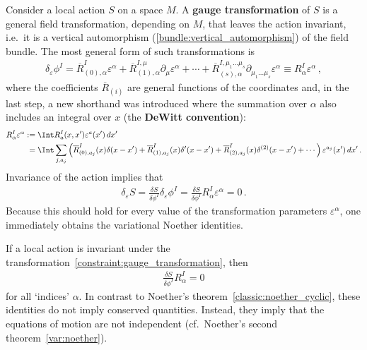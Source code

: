     Consider a local action $S$ on a space $M$. A \textbf{gauge transformation} of $S$ is a general field transformation, depending on $M$, that leaves the action invariant, i.e.~it is a vertical automorphism (\cref{bundle:vertical_automorphism}) of the field bundle. The most general form of such transformations is
    \begin{gather}
        \label{constraint:gauge_transformation}
        \delta_\varepsilon\phi^I = \overline{R}^I_{(0),\alpha}\varepsilon^\alpha + \overline{R}^{I,\mu}_{(1),\alpha}\partial_\mu\varepsilon^\alpha + \cdots + \overline{R}^{I,\mu_1\ldots\mu_s}_{(s),\alpha}\partial_{\mu_1\ldots\mu_s}\varepsilon^\alpha\equiv R^I_\alpha\varepsilon^\alpha\,,
    \end{gather}
    where the coefficients $\overline{R}_{(i)}$ are general functions of the coordinates and, in the last step, a new shorthand was introduced where the summation over $\alpha$ also includes an integral over $x$ (the \textbf{DeWitt convention}):
    \begin{align}
        R^I_\alpha\varepsilon^\alpha &:= \Int R^I_a(x,x')\varepsilon^a(x')\,dx'\label{constraint:dewitt_convention}\\
        &\phantom{:}= \Int\sum_{j,a_j}\left(\overline{R}^I_{(0),a_j}(x)\delta(x-x')+\overline{R}^I_{(1),a_j}(x)\delta'(x-x')+\overline{R}^I_{(2),a_j}(x)\delta^{(2)}(x-x')+\cdots\right)\varepsilon^{a_j}(x')\,dx'\,.\nonumber
    \end{align}
    Invariance of the action implies that
    \begin{gather}
        \delta_\varepsilon S = \frac{\delta S}{\delta\phi^I}\delta_\varepsilon\phi^I = \frac{\delta S}{\delta\phi^I}R^I_\alpha\varepsilon^\alpha = 0\,.
    \end{gather}
    Because this should hold for every value of the transformation parameters $\varepsilon^\alpha$, one immediately obtains the variational Noether identities.
    \begin{property}\label{field:noether_identity}
        If a local action is invariant under the transformation~\eqref{constraint:gauge_transformation}, then
        \begin{gather}
            \frac{\delta S}{\delta\phi^I}R^I_\alpha = 0
        \end{gather}
        for all `indices' $\alpha$. In contrast to Noether's theorem~\ref{classic:noether_cyclic}, these identities do not imply conserved quantities. Instead, they imply that the equations of motion are not independent (cf.~Noether's second theorem~\ref{var:noether}).
    \end{property}

